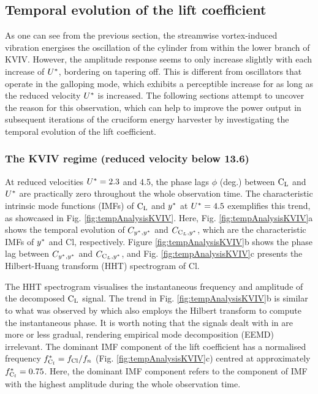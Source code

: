 \documentclass[oneside]{utmthesis}
\begin{document}
\subsection{Temporal evolution of the lift coefficient} \label{ssec:tempEvo}
As one can see from the previous section, the streamwise vortex-induced vibration energises the oscillation of the cylinder from within the lower branch of KVIV. However, the amplitude response seems to only increase slightly with each increase of $U^{*}$, bordering on tapering off. This is different from oscillators that operate in the galloping mode, which exhibits a perceptible increase for as long as the reduced velocity $U^{*}$ is increased. The following sections attempt to uncover the reason for this observation, which can help to improve the power output in subsequent iterations of the cruciform energy harvester by investigating the temporal evolution of the lift coefficient.

\subsubsection{The KVIV regime (reduced velocity below 13.6)} \label{sssec:phaseLag}
At reduced velocities  $U^{*} = 2.3$ and 4.5, the phase lags  $\phi$ (deg.) between $\text{C}_{\text{L}}$ and  $U^{*}$ are practically zero throughout the whole observation time. The characteristic intrinsic mode functions (IMFs) of $\text{C}_{\text{L}}$ and  $y^{*}$ at $U^{*} = 4.5$ exemplifies this trend, as showcased in Fig. \ref{fig:tempAnalysisKVIV}. Here, Fig. \ref{fig:tempAnalysisKVIV}a shows the temporal evolution of $C_{y^{*},y^{*}}$ and $C_{\text{C}_{L},y^{*}}$, which are the characteristic IMFs of $y^{*}$ and Cl, respectively. Figure \ref{fig:tempAnalysisKVIV}b shows the phase lag between $C_{y^{*},y^{*}}$ and $C_{\text{C}_{L},y^{*}}$, and Fig. \ref{fig:tempAnalysisKVIV}c presents the Hilbert-Huang transform (HHT) spectrogram of Cl.

The HHT spectrogram visualises the instantaneous frequency and amplitude of the decomposed $\text{C}_{\text{L}}$ signal. The trend in Fig. \ref{fig:tempAnalysisKVIV}b is similar to what was observed by \citet{Khalak1999} which also employs the Hilbert transform to compute the instantaneous phase. It is worth noting that the signals dealt with in \citet{Khalak1999} are more or less gradual, rendering empirical mode decomposition (EEMD) irrelevant. The dominant IMF component of the lift coefficient has a normalised frequency $f_{\text{C}_{l}}^{*} = f_{\text{Cl}}/f_{n}$ (Fig. \ref{fig:tempAnalysisKVIV}c) centred at approximately $f_{\text{C}_{l}}^{*} = 0.75$. Here, the dominant IMF component refers to the component of IMF with the highest amplitude during the whole observation time.
\end{document}
